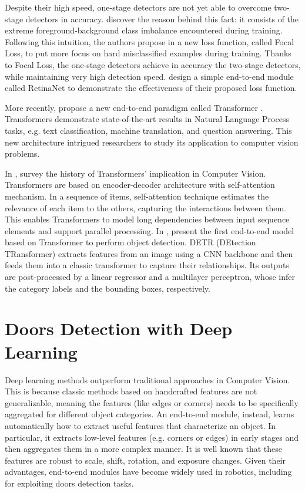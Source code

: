  Despite their high speed, one-stage detectors are not yet able to overcome two-stage detectors in accuracy. \citeauthor{focalloss} discover the reason behind this fact: it consists of the extreme foreground-background class imbalance encountered during training. Following this intuition, the authors propose in \cite{focalloss} a new loss function, called Focal Loss, to put more focus on hard misclassified examples during training. Thanks to Focal Loss, the one-stage detectors achieve in accuracy the two-stage detectors, while maintaining very high detection speed. \citeauthor{focalloss} design a simple end-to-end module called RetinaNet to demonstrate the effectiveness of their proposed loss function. 
 
 More recently, \citeauthor{transformer} propose a new end-to-end paradigm called Transformer \cite{transformer}. Transformers demonstrate state-of-the-art results in Natural Language Process tasks, e.g. text classification, machine translation, and question answering. This new architecture intrigued researchers to study its application to computer vision problems. 
 
 In \cite{surveytransformer}, \citeauthor{surveytransformer} survey the history of Transformers' implication in Computer Vision. Transformers are based on encoder-decoder architecture with self-attention mechanism. In a sequence of items, self-attention technique estimates the relevance of each item to the others, capturing the interactions between them. This enables Transformers to model long dependencies between input sequence elements and support parallel processing. In \cite{detr}, \citeauthor{detr} present the first end-to-end model based on Transformer to perform object detection. DETR (DEtection TRansformer) extracts features from an image using a CNN backbone and then feeds them into a classic transformer to capture their relationships. Its outputs are post-processed by a linear regressor and a multilayer perceptron, whose infer the category labels and the bounding boxes, respectively.
 
 \section{Doors Detection with Deep Learning} 
 Deep learning methods outperform traditional approaches in Computer Vision. This is because classic methods based on handcrafted features are not generalizable, meaning the features (like edges or corners) needs to be specifically aggregated for different object categories. An end-to-end module, instead, learns automatically how to extract useful features that characterize an object. In particular, it extracts low-level features (e.g. corners or edges) in early stages and then aggregates them in a more complex manner. It is well known that these features are robust to scale, shift, rotation, and exposure changes. Given their advantages, end-to-end modules have become widely used in robotics, including for exploiting doors detection tasks. 
 
